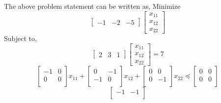 \documentclass{beamer}
\begin{document}
\begin{frame}{}
    The above problem statement can be written as, Minimize
    \begin{equation*}
        \begin{bmatrix}
            -1 & -2 & -5 
        \end{bmatrix}
        \begin{bmatrix}
            x_{11} \\
            x_{12} \\
            x_{22} 
        \end{bmatrix}
    \end{equation*}
    Subject to,\\
     \begin{equation*}
        \begin{bmatrix}
            2 & 3 & 1 
        \end{bmatrix}
        \begin{bmatrix}
            x_{11} \\
            x_{12} \\
            x_{22} 
        \end{bmatrix}
        = 7
    \end{equation*}
    \begin{equation*}
        \begin{bmatrix}
            -1 & 0  \\
            0 & 0  \\
        \end{bmatrix}
        x_{11} +
        \begin{bmatrix}
            0 & -1  \\
            -1 & 0  \\
        \end{bmatrix}
        x_{12} +
        \begin{bmatrix}
            0 & 0  \\
            0 & -1  \\
        \end{bmatrix}
        x_{22} \preccurlyeq
        \begin{bmatrix}
            0 & 0  \\
            0 & 0  \\
        \end{bmatrix}
    \end{equation*}
    \begin{equation*}
        \begin{bmatrix}
            -1 & -1  \\

\end{bmatrix}
\end{equation*}
\end{frame}
\end{document}
